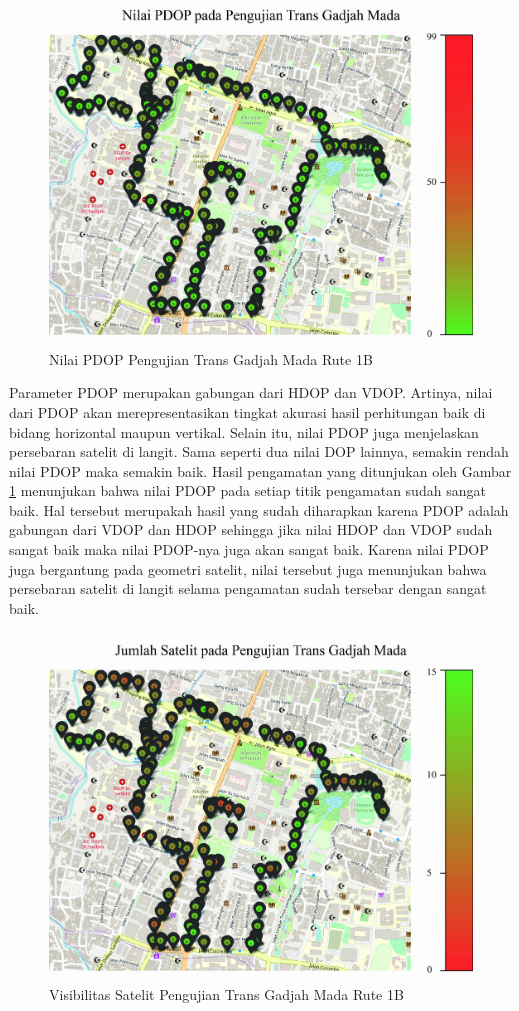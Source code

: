 \begin{figure}[H]
	\centering
	\includegraphics[width=12cm]{contents/chapter-4/pengujian-bergerak/moving-PDOP.jpg}
	\caption{Nilai PDOP Pengujian Trans Gadjah Mada Rute 1B}
	\label{Fig: moving-pdop}
\end{figure}

Parameter PDOP merupakan gabungan dari HDOP dan VDOP. Artinya, nilai dari PDOP akan merepresentasikan tingkat akurasi hasil perhitungan baik di bidang horizontal maupun vertikal. Selain itu, nilai PDOP juga menjelaskan persebaran satelit di langit. Sama seperti dua nilai DOP lainnya, semakin rendah nilai PDOP maka semakin baik. Hasil pengamatan yang ditunjukan oleh Gambar \ref{Fig: moving-pdop} menunjukan bahwa nilai PDOP pada setiap titik pengamatan sudah sangat baik. Hal tersebut merupakah hasil yang sudah diharapkan karena PDOP adalah gabungan dari VDOP dan HDOP sehingga jika nilai HDOP dan VDOP sudah sangat baik maka nilai PDOP-nya juga akan sangat baik. Karena nilai PDOP juga bergantung pada geometri satelit, nilai tersebut juga menunjukan bahwa persebaran satelit di langit selama pengamatan sudah tersebar dengan sangat baik. 

\begin{figure}[H]
	\centering
	\includegraphics[width=12cm]{contents/chapter-4/pengujian-bergerak/moving-SATS.jpg}
	\caption{Visibilitas Satelit Pengujian Trans Gadjah Mada Rute 1B}
	\label{Fig: moving-sats}
\end{figure}

